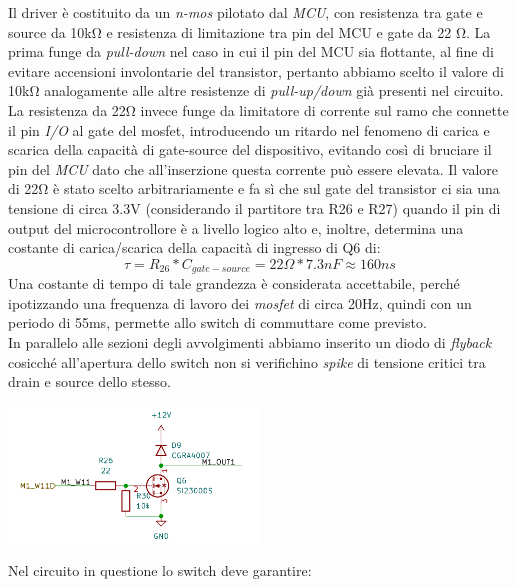 \noindent Il driver è costituito da un \textit{n-mos} pilotato dal \textit{MCU}, con resistenza tra gate e source da 10kΩ 
e resistenza di limitazione tra pin del MCU e gate da 22 Ω. 
La prima funge da \textit{pull-down} nel caso in cui il pin
del MCU sia flottante, al fine di evitare accensioni involontarie del
transistor, pertanto abbiamo scelto il valore di 10kΩ analogamente alle
altre resistenze di \textit{pull-up/down} già presenti nel circuito. La
resistenza da 22Ω invece funge da limitatore di corrente sul ramo che connette il pin \textit{I/O} al
gate del mosfet, introducendo un ritardo nel fenomeno di carica e scarica
della capacità di gate-source del dispositivo, evitando così di bruciare
il pin del \textit{MCU} dato che all'inserzione questa corrente può essere
elevata. Il valore di 22Ω è stato scelto arbitrariamente e fa sì che sul
gate del transistor ci sia una tensione di circa 3.3V (considerando il
partitore tra R26 e R27) quando il pin di output del microcontrollore è
a livello logico alto e, inoltre, determina una costante di
carica/scarica della capacità di ingresso di Q6 di:
\[\tau = R_{ 26} * C_{gate - source} = 22 \Omega * 7.3nF \approx 160ns\]
Una costante di tempo di tale grandezza è considerata accettabile,
perché ipotizzando una frequenza di lavoro dei \textit{mosfet} di circa 20Hz,
quindi con un periodo di 55ms, permette allo switch di commuttare come
previsto.\\
In parallelo alle sezioni degli avvolgimenti abbiamo inserito un diodo di
\textit{flyback} cosicché all'apertura dello switch non si verifichino \textit{spike} di
tensione critici tra drain e source dello stesso.

\begin{center}
\includegraphics[width=0.5\textwidth]{figures/image63.png}
\captionsetup{type=figure}
\end{center}

\noindent Nel circuito in questione lo switch deve garantire:

